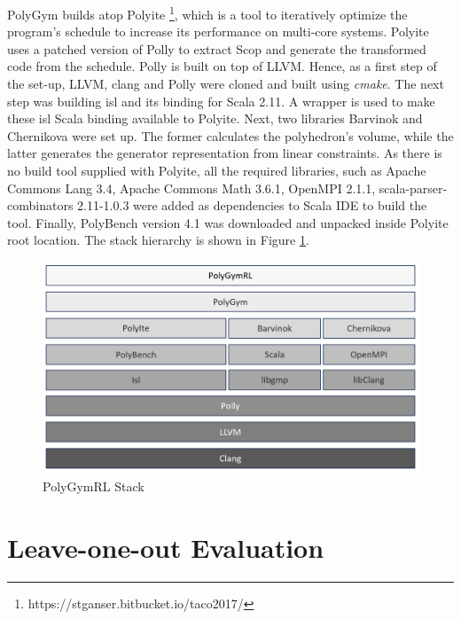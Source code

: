 \documentclass[logo,msc]{infthesis}           %
\begin{document}
PolyGym builds atop Polyite \footnote{https://stganser.bitbucket.io/taco2017/}, which is a tool to iteratively optimize the program's schedule to increase its performance on multi-core systems. Polyite uses a patched version of Polly to extract Scop and generate the transformed code from the schedule. Polly is built on top of LLVM. Hence, as a first step of the set-up, LLVM\cite{LLVM:CGO04}, clang and Polly were cloned and built using \textit{cmake}. The next step was building isl\cite{isl} and its binding for Scala 2.11. A wrapper is used to make these isl Scala binding available to Polyite\cite{10.1145/3109482}. Next, two libraries Barvinok\cite{10.5555/261410.261418} and Chernikova\cite{leverge:inria-00074895} were set up. The former calculates the polyhedron's volume, while the latter generates the generator representation from linear constraints. As there is no build tool supplied with Polyite, all the required libraries, such as Apache Commons Lang 3.4, Apache Commons Math 3.6.1, OpenMPI 2.1.1\cite{OpenMPI}, scala-parser-combinators 2.11-1.0.3 were added as dependencies to Scala IDE to build the tool. Finally, PolyBench version 4.1 was downloaded and unpacked inside Polyite root location. The stack hierarchy is shown in Figure \ref{fig::stack}.

\begin{figure}[htbp]  
  \centering
  \includegraphics[width=\textwidth]{Images/PolyGymRlStack.png}    
  \caption{PolyGymRL Stack}
  \label{fig::stack}
\end{figure}



\section{Leave-one-out Evaluation}
\end{document}

